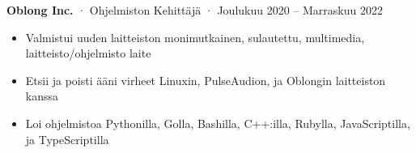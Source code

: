 \documentclass[12pt, oneside]{article}
\newcommand{\jobtitle}[3] {
	{\bf #1} · {#2} · {#3} \vspace{-7pt} \\
}
\begin{document}
\begin{flushleft}
\jobtitle{Oblong Inc.}{Ohjelmiston Kehittäjä}{Joulukuu 2020 – Marraskuu 2022}
\begin{itemize}
	\item Valmistui uuden laitteiston monimutkainen, sulautettu, multimedia, laitteisto/ohjelmisto laite \\
	\item Etsii ja poisti ääni virheet Linuxin, PulseAudion, ja Oblongin laitteiston kanssa \\
	\item Loi ohjelmistoa Pythonilla, Golla, Bashilla, C++:illa, Rubylla, JavaScriptilla, ja TypeScriptilla \\
\end{itemize}


\end{flushleft}
\end{document}
